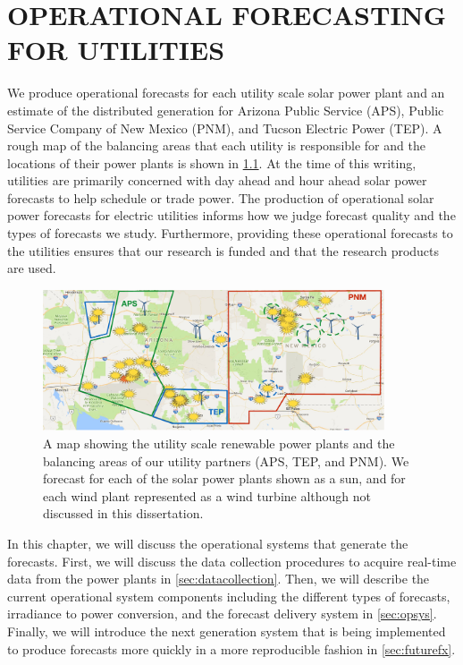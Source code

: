 \chapter{OPERATIONAL FORECASTING FOR UTILITIES}
\label{chap:operations}

We produce operational forecasts for each utility scale solar power
plant and an estimate of the distributed generation for Arizona Public
Service (APS), Public Service Company of New Mexico (PNM), and Tucson
Electric Power (TEP).
A rough map of the balancing areas that each utility is responsible
for and the locations of their power plants is shown in
\cref{fig:utilitymap}.
At the time of this writing, utilities are primarily concerned with
day ahead and hour ahead solar power forecasts to help schedule or
trade power.
The production of operational solar power forecasts for electric
utilities informs how we judge forecast quality and the types of
forecasts we study.
Furthermore, providing these operational forecasts to the utilities
ensures that our research is funded and that the research products
are used.

\begin{figure}[htb]
\centering
\includegraphics[width=0.9\textwidth]{figs/fxmap.pdf}
\caption[Map of utility scale renewable power plants]{A map showing
the utility scale renewable power plants and the balancing areas of
our utility partners (APS, TEP, and PNM). We forecast for each of the
solar power plants shown as a sun, and for each wind plant represented
as a wind turbine although not discussed in this dissertation.}
\label{fig:utilitymap}
\end{figure}

In this chapter, we will discuss the operational systems that generate
the forecasts.
First, we will discuss the data collection procedures to acquire
real-time data from the power plants in \cref{sec:datacollection}.
Then, we will describe the current operational system components
including the different types of forecasts, irradiance to power
conversion, and the forecast delivery system in \cref{sec:opsys}.
Finally, we will introduce the next generation system that is being
implemented to produce forecasts more quickly in a more reproducible
fashion in \cref{sec:futurefx}.

